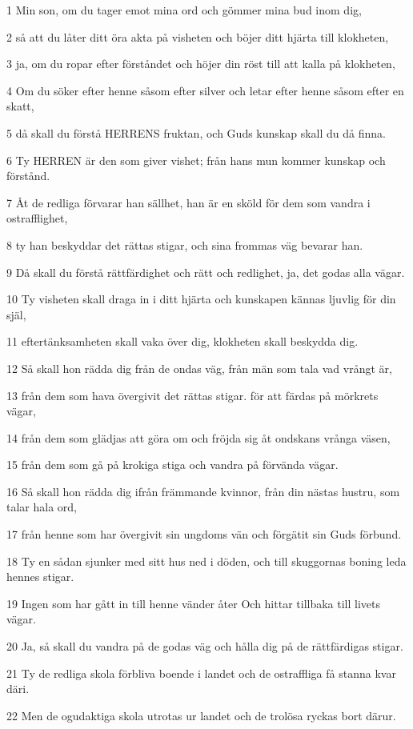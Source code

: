 \par 1 Min son, om du tager emot mina ord och gömmer mina bud inom dig,
\par 2 så att du låter ditt öra akta på visheten och böjer ditt hjärta till klokheten,
\par 3 ja, om du ropar efter förståndet och höjer din röst till att kalla på klokheten,
\par 4 Om du söker efter henne såsom efter silver och letar efter henne såsom efter en skatt,
\par 5 då skall du förstå HERRENS fruktan, och Guds kunskap skall du då finna.
\par 6 Ty HERREN är den som giver vishet; från hans mun kommer kunskap och förstånd.
\par 7 Åt de redliga förvarar han sällhet, han är en sköld för dem som vandra i ostrafflighet,
\par 8 ty han beskyddar det rättas stigar, och sina frommas väg bevarar han.
\par 9 Då skall du förstå rättfärdighet och rätt och redlighet, ja, det godas alla vägar.
\par 10 Ty visheten skall draga in i ditt hjärta och kunskapen kännas ljuvlig för din själ,
\par 11 eftertänksamheten skall vaka över dig, klokheten skall beskydda dig.
\par 12 Så skall hon rädda dig från de ondas väg, från män som tala vad vrångt är,
\par 13 från dem som hava övergivit det rättas stigar. för att färdas på mörkrets vägar,
\par 14 från dem som glädjas att göra om och fröjda sig åt ondskans vrånga väsen,
\par 15 från dem som gå på krokiga stiga och vandra på förvända vägar.
\par 16 Så skall hon rädda dig ifrån främmande kvinnor, från din nästas hustru, som talar hala ord,
\par 17 från henne som har övergivit sin ungdoms vän och förgätit sin Guds förbund.
\par 18 Ty en sådan sjunker med sitt hus ned i döden, och till skuggornas boning leda hennes stigar.
\par 19 Ingen som har gått in till henne vänder åter Och hittar tillbaka till livets vägar.
\par 20 Ja, så skall du vandra på de godas väg och hålla dig på de rättfärdigas stigar.
\par 21 Ty de redliga skola förbliva boende i landet och de ostraffliga få stanna kvar däri.
\par 22 Men de ogudaktiga skola utrotas ur landet och de trolösa ryckas bort därur.

